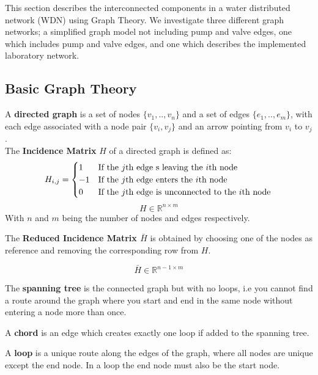 This section describes the interconnected components in a water distributed network (WDN) using Graph Theory. We investigate three different graph networks; a simplified graph model not including pump and valve edges, one which includes pump and valve edges, and one which describes the implemented laboratory network.


\subsection{Basic Graph Theory}

A \textbf{directed graph} is a set of nodes $ \{v_1,..,v_n\} $ and a set of edges $ \{e_1,..,e_m\} $, with each edge associated with a node pair $ \{v_i,v_j\} $ and an arrow pointing from $ v_i $ to $ v_j $. \\

The \textbf{Incidence Matrix} $H$ of a directed graph is defined as:
\begin{equation*}
	H_{i,j} = \begin{cases}
		1 & \text{If the $j$th edge s leaving the $i$th node}\\
		-1 & \text{If the $j$th edge enters the $i$th node} \\
		0 & \text{If the $j$th edge is unconnected to the $i$th node} 
		
	\end{cases}\\
\end{equation*} 
\begin{equation*}
	H\in \mathbb{R}^{n\times m}
\end{equation*}
With $n$ and $m$ being the number of nodes and edges respectively.

The \textbf{Reduced Incidence Matrix $\bar{H}$} is obtained by choosing one of the nodes as reference and removing the corresponding row from $ H $.

\begin{equation*}
	\bar{H}\in \mathbb{R}^{n-1\times m}
\end{equation*}

The \textbf{spanning tree} is the connected graph but with no loops, i.e you cannot find a route around the graph where you start and end in the same node without entering a node more than once. 

A \textbf{chord} is an edge which creates exactly one loop if added to the spanning tree. 

A \textbf{loop} is a unique route along the edges of the graph, where all nodes are unique except the end node. In a loop the end node must also be the start node. 

